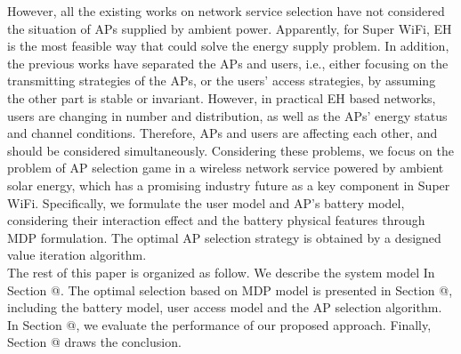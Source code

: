 \documentclass[conference]{IEEEtran}
\makeatletter
\newcommand{\Rmnum}[1]{\expandafter\@slowromancap\romannumeral #1@}
\makeatother
\begin{document}
\indent However, all the existing works on network service selection have not considered the situation of APs supplied by ambient power. Apparently, for Super WiFi, EH is the most feasible way that could solve the energy supply problem. In addition, the previous works have separated the APs and users, i.e., either focusing on the transmitting strategies of the APs, or the users' access strategies, by assuming the other part is stable or invariant. However, in practical EH based networks, users are changing in number and distribution, as well as the APs' energy status and channel conditions. Therefore, APs and users are affecting each other, and should be considered simultaneously. Considering these problems, we focus on the problem of AP selection game in a wireless network service powered by ambient solar energy, which has a promising industry future as a key component in Super WiFi. Specifically, we formulate the user model and AP's battery model, considering their interaction effect and the battery physical features through MDP formulation. The optimal AP selection strategy is obtained by a designed value iteration algorithm.\\
\indent The rest of this paper is organized as follow. We describe the system model In Section \Rmnum{2}. The optimal selection based on MDP model is presented in Section \Rmnum{3}, including the battery model, user access model and the AP selection algorithm. In Section \Rmnum{4}, we evaluate the performance of our proposed approach. Finally, Section \Rmnum{5} draws the conclusion.
\end{document}
